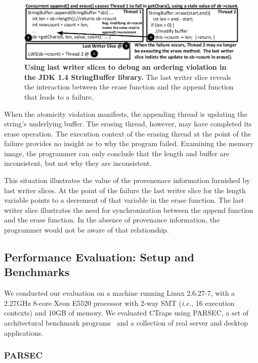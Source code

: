 \documentclass[preprint,9pt]{sigplanconf}
\newcommand{\ctraps}{CTraps\xspace}
\begin{document}
\begin{figure}[h]
\centering
\includegraphics[width=\columnwidth]{figs/JDKStringBufferDebug.pdf}
\caption{\label{fig:jdklws}{\bf Using last writer slices to debug an
ordering violation in the JDK 1.4 StringBuffer library.} The last writer slice reveals the interaction between the erase function and the append function that leads to a failure.}
\end{figure}

When the atomicity violation manifests, the appending thread is updating the
string's underlying buffer.  The erasing thread, however, may have completed
its erase operation.  The execution context of the erasing thread at the point
of the failure provides no insight as to why the program failed.  Examining the memory image, the programmer can only conclude that the length and buffer are 
inconsistent, but not why they are inconsistent.

This situation illustrates the value of the provenenace information furnished
by last writer slices.  At the point of the failure the last writer slice for
the length variable points to a decrement of that variable in the erase
function.  The last writer slice illustrates the need for synchronization
between the append function and the erase function.  In the absence of
provenance information, the programmer would not be aware of that relationship.


\subsection{Performance Evaluation: Setup and Benchmarks}

We conducted our evaluation on a machine running Linux 2.6.27-7, with a 2.27GHz
8-core Xeon E5520 processor with 2-way SMT ({\em i.e.}, 16 execution contexts)
and 10GB of memory.  We evaluated \ctraps using PARSEC, a set of architectural
benchmark programs~\cite{parsec} and a collection of real server and desktop
applications.    

\subsubsection{PARSEC}
\end{document}
